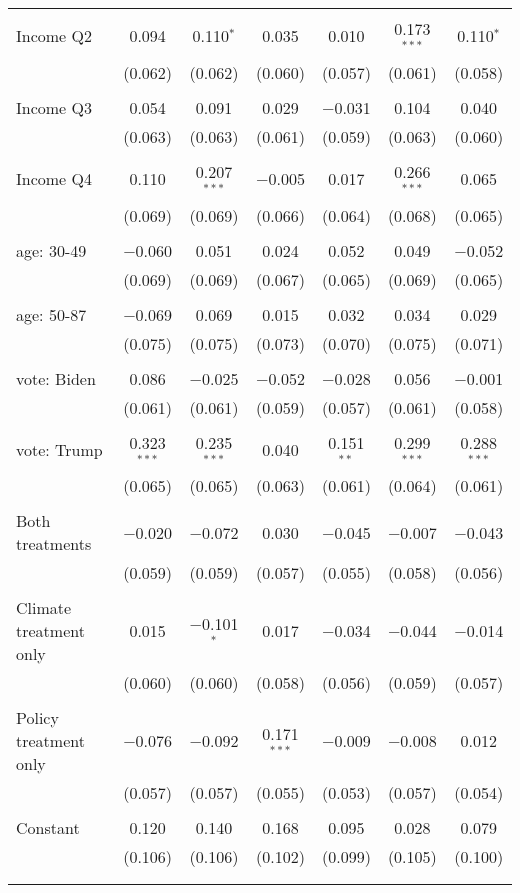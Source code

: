 \begin{tabular}{@{\extracolsep{5pt}}lcccccc}
  & & & & & & \\ 
 Income Q2 & 0.094 & 0.110$^{*}$ & 0.035 & 0.010 & 0.173$^{***}$ & 0.110$^{*}$ \\ 
  & (0.062) & (0.062) & (0.060) & (0.057) & (0.061) & (0.058) \\ 
  & & & & & & \\ 
 Income Q3 & 0.054 & 0.091 & 0.029 & $-$0.031 & 0.104 & 0.040 \\ 
  & (0.063) & (0.063) & (0.061) & (0.059) & (0.063) & (0.060) \\ 
  & & & & & & \\ 
 Income Q4 & 0.110 & 0.207$^{***}$ & $-$0.005 & 0.017 & 0.266$^{***}$ & 0.065 \\ 
  & (0.069) & (0.069) & (0.066) & (0.064) & (0.068) & (0.065) \\ 
  & & & & & & \\ 
 age: 30-49 & $-$0.060 & 0.051 & 0.024 & 0.052 & 0.049 & $-$0.052 \\ 
  & (0.069) & (0.069) & (0.067) & (0.065) & (0.069) & (0.065) \\ 
  & & & & & & \\ 
 age: 50-87 & $-$0.069 & 0.069 & 0.015 & 0.032 & 0.034 & 0.029 \\ 
  & (0.075) & (0.075) & (0.073) & (0.070) & (0.075) & (0.071) \\ 
  & & & & & & \\ 
 vote: Biden & 0.086 & $-$0.025 & $-$0.052 & $-$0.028 & 0.056 & $-$0.001 \\ 
  & (0.061) & (0.061) & (0.059) & (0.057) & (0.061) & (0.058) \\ 
  & & & & & & \\ 
 vote: Trump & 0.323$^{***}$ & 0.235$^{***}$ & 0.040 & 0.151$^{**}$ & 0.299$^{***}$ & 0.288$^{***}$ \\ 
  & (0.065) & (0.065) & (0.063) & (0.061) & (0.064) & (0.061) \\ 
  & & & & & & \\ 
 Both treatments & $-$0.020 & $-$0.072 & 0.030 & $-$0.045 & $-$0.007 & $-$0.043 \\ 
  & (0.059) & (0.059) & (0.057) & (0.055) & (0.058) & (0.056) \\ 
  & & & & & & \\ 
 Climate treatment only & 0.015 & $-$0.101$^{*}$ & 0.017 & $-$0.034 & $-$0.044 & $-$0.014 \\ 
  & (0.060) & (0.060) & (0.058) & (0.056) & (0.059) & (0.057) \\ 
  & & & & & & \\ 
 Policy treatment only & $-$0.076 & $-$0.092 & 0.171$^{***}$ & $-$0.009 & $-$0.008 & 0.012 \\ 
  & (0.057) & (0.057) & (0.055) & (0.053) & (0.057) & (0.054) \\ 
  & & & & & & \\ 
 Constant & 0.120 & 0.140 & 0.168 & 0.095 & 0.028 & 0.079 \\ 
  & (0.106) & (0.106) & (0.102) & (0.099) & (0.105) & (0.100) \\ 
  & & & & & & \\ 
\hline \\[-1.8ex] 


\end{tabular}
